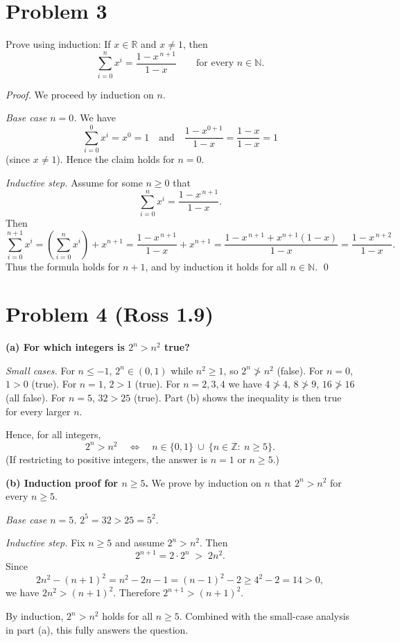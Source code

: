 \documentclass[12pt]{article}
\begin{document}
\section*{Problem 3}
Prove using induction: If $x\in\mathbb R$ and $x\ne 1$, then
\[
\sum_{i=0}^{n} x^{i}=\frac{1-x^{\,n+1}}{1-x}\qquad\text{for every }n\in\mathbb N.
\]

\textit{Proof.} We proceed by induction on $n$.

\emph{Base case $n=0$.} We have
\[
\sum_{i=0}^{0}x^i=x^0=1
\quad\text{and}\quad
\frac{1-x^{0+1}}{1-x}=\frac{1-x}{1-x}=1
\]
(since $x\ne1$). Hence the claim holds for $n=0$.

\emph{Inductive step.} Assume for some $n\ge0$ that
\[
\sum_{i=0}^{n}x^i=\frac{1-x^{\,n+1}}{1-x}.
\]
Then
\[
\sum_{i=0}^{n+1}x^i
=\left(\sum_{i=0}^{n}x^i\right)+x^{n+1}
=\frac{1-x^{\,n+1}}{1-x}+x^{n+1}
=\frac{1-x^{\,n+1}+x^{n+1}(1-x)}{1-x}
=\frac{1-x^{\,n+2}}{1-x}.
\]
Thus the formula holds for $n+1$, and by induction it holds for all $n\in\mathbb N$.
\qed
\section*{Problem 4 (Ross 1.9)}
\textbf{(a) For which integers is $2^{n}>n^{2}$ true?}

\emph{Small cases.} For $n\le -1$, $2^{n}\in(0,1)$ while $n^{2}\ge 1$, so $2^{n}\not> n^{2}$ (false).
For $n=0$, $1>0$ (true). For $n=1$, $2>1$ (true). For $n=2,3,4$ we have
$4\not>4$, $8\not>9$, $16\not>16$ (all false). For $n=5$, $32>25$ (true).
Part (b) shows the inequality is then true for every larger $n$.

Hence, for all integers,
\[
2^{n}>n^{2} \quad \Longleftrightarrow \quad n\in\{0,1\}\ \cup\ \{n\in\mathbb Z:\ n\ge 5\}.
\]
(If restricting to positive integers, the answer is $n=1$ or $n\ge 5$.)

\medskip
\textbf{(b) Induction proof for $n\ge 5$.}
We prove by induction on $n$ that $2^{n}>n^{2}$ for every $n\ge 5$.

\emph{Base case $n=5$.} $2^{5}=32>25=5^{2}$.

\emph{Inductive step.} Fix $n\ge 5$ and assume $2^{n}>n^{2}$. Then
\[
2^{n+1}=2\cdot 2^{n} \;>\; 2n^{2}.
\]
Since
\[
2n^{2}-(n+1)^{2}=n^{2}-2n-1=(n-1)^{2}-2 \ge 4^{2}-2=14>0,
\]
we have $2n^{2}>(n+1)^{2}$. Therefore $2^{n+1}>(n+1)^{2}$.

By induction, $2^{n}>n^{2}$ holds for all $n\ge 5$. Combined with the small-case
analysis in part (a), this fully answers the question.
\end{document}

